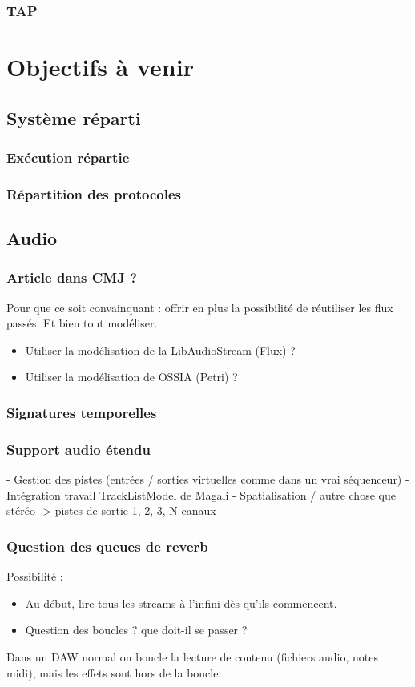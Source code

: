 \documentclass[french,a4paper,openany,12pt]{book}
\begin{document}
\subsection{TAP}

\chapter{Objectifs à venir}
\section{Système réparti}
\subsection{Exécution répartie}
\subsection{Répartition des protocoles}

\section{Audio}
\subsection{Article dans CMJ ?}
Pour que ce soit convainquant : offrir en plus la possibilité 
de réutiliser les flux passés. Et bien tout modéliser.

\begin{itemize}
\item Utiliser la modélisation de la LibAudioStream (Flux) ?
\item Utiliser la modélisation de OSSIA (Petri) ?
\end{itemize}

\subsection{Signatures temporelles}
\subsection{Support audio étendu}
- Gestion des pistes (entrées / sorties virtuelles comme dans un vrai séquenceur)
- Intégration travail TrackListModel de Magali
- Spatialisation / autre chose que stéréo
-> pistes de sortie 1, 2, 3, N canaux 

\subsection{Question des queues de reverb}
Possibilité : 
\begin{itemize}
\item Au début, lire tous les streams à l'infini dès qu'ils commencent.
\item Question des boucles ? que doit-il se passer ? 
\end{itemize}
Dans un DAW normal on boucle la lecture de contenu (fichiers audio, notes midi), mais les effets 
sont hors de la boucle.
\end{document}
